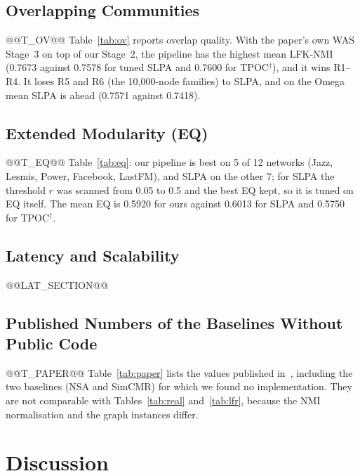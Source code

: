 \documentclass[conference]{IEEEtran}
\begin{document}
\subsection{Overlapping Communities}
@@T_OV@@
Table~\ref{tab:ov} reports overlap quality. With the paper's own WAS Stage~3 on top of our Stage~2, the pipeline has the highest mean LFK-NMI (0.7673 against 0.7578 for tuned SLPA and 0.7600 for TPOC$^{\dagger}$), and it wins R1--R4. It loses R5 and R6 (the 10{,}000-node families) to SLPA, and on the Omega mean SLPA is ahead (0.7571 against 0.7418).

\subsection{Extended Modularity (EQ)}
@@T_EQ@@
Table~\ref{tab:eq}: our pipeline is best on 5 of 12 networks (Jazz, Lesmis, Power, Facebook, LastFM), and SLPA on the other 7; for SLPA the threshold $r$ was scanned from 0.05 to 0.5 and the best EQ kept, so it is tuned on EQ itself. The mean EQ is 0.5920 for ours against 0.6013 for SLPA and 0.5750 for TPOC$^{\dagger}$.

\subsection{Latency and Scalability}\label{sec:latency}
@@LAT_SECTION@@
\subsection{Published Numbers of the Baselines Without Public Code}
@@T_PAPER@@
Table~\ref{tab:paper} lists the values published in~\cite{kong2026}, including the two baselines (NSA and SimCMR) for which we found no implementation. They are not comparable with Tables~\ref{tab:real} and~\ref{tab:lfr}, because the NMI normalisation and the graph instances differ.

\section{Discussion}\label{sec:discussion}
\end{document}

